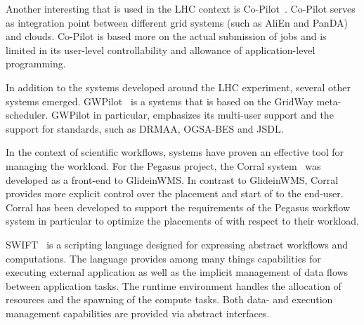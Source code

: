 \documentclass{sig-alternate}
\begin{document}
Another interesting \pilot that is used in the LHC context is
Co-Pilot~\cite{copilot-tr}.
Co-Pilot serves as integration point between different grid \pilotjob systems
(such as AliEn and PanDA) and clouds.
Co-Pilot is based more on the actual submission of jobs and is limited in its
user-level controllability and allowance of application-level programming.

In addition to the \pilotjob systems developed around the LHC
experiment, several other systems emerged. GWPilot~\cite{gwpilot} is a
\pilot systems that is based on the GridWay meta-scheduler. GWPilot in
particular, emphasizes its multi-user support and the support for
standards, such as DRMAA, OGSA-BES and JSDL. 




In the context of scientific workflows, \pilotjob systems have proven
an effective tool for managing the workload.  For the Pegasus project,
the Corral system~\cite{Rynge:2011:EUG:2116259.2116599} was developed
as a front-end to GlideinWMS.  In contrast to GlideinWMS, Corral
provides more explicit control over the placement and start of \pilots
to the end-user.
Corral has been developed to support the requirements of the Pegasus workflow
system in particular to optimize the placements of \pilots with respect to
their workload.


SWIFT~\cite{Wilde2011} is a scripting language designed for expressing
abstract workflows and computations.
The language provides among many things capabilities for executing external
application as well as the implicit management of data flows between
application tasks.
The runtime environment handles the allocation of resources and the spawning of
the compute tasks.
Both data- and execution management capabilities are provided
via abstract interfaces.
\end{document}
